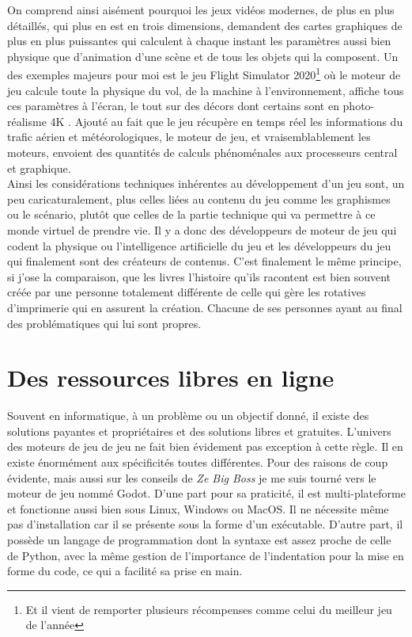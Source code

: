\documentclass{tstextbook}
\begin{document}
On comprend ainsi aisément pourquoi les jeux vidéos modernes, de plus en plus détaillés, qui plus en est en trois dimensions, demandent des cartes graphiques de plus en plus puissantes qui calculent à chaque instant les paramètres aussi bien physique que d'animation d'une scène et de tous les objets qui la composent. Un des exemples majeurs pour moi est le jeu Flight Simulator 2020\footnote{Et il vient de remporter plusieurs récompenses comme celui du meilleur jeu de l'année} où le moteur de jeu calcule toute la physique du vol, de la machine à l'environnement, affiche tous ces paramètres à l'écran, le tout sur des décors dont certains sont en photo-réalisme 4K . Ajouté au fait que le jeu récupère en temps réel les informations du trafic aérien et météorologiques, le moteur de jeu, et vraisemblablement les moteurs, envoient des quantités de calculs phénoménales aux processeurs central et graphique. \\

Ainsi les considérations techniques inhérentes au développement d'un jeu sont, un peu caricaturalement, plus celles liées au contenu du jeu comme les graphismes ou le scénario, plutôt que celles de la partie technique qui va permettre à ce monde virtuel de prendre vie. Il y a donc des développeurs de moteur de jeu qui codent la physique ou l'intelligence artificielle du jeu et les développeurs du jeu qui finalement sont des créateurs de contenus. C'est finalement le même principe, si j'ose la comparaison, que les livres l'histoire qu'ils racontent est bien souvent créée par une personne totalement différente de celle qui gère les rotatives d’imprimerie qui en assurent la création. Chacune de ses personnes ayant au final des problématiques qui lui sont propres.
\section{Des ressources libres en ligne}
Souvent en informatique, à un problème ou un objectif donné, il existe des solutions payantes et propriétaires et des solutions libres et gratuites. L'univers des moteurs de jeu de jeu ne fait bien évidement pas exception à cette règle. Il en existe énormément aux spécificités toutes différentes. Pour des raisons de coup évidente, mais aussi sur les conseils de \emph{Ze Big Boss} je me suis tourné vers le moteur de jeu nommé Godot. D'une part pour sa praticité, il est multi-plateforme et fonctionne aussi bien sous Linux, Windows ou MacOS. Il ne nécessite même pas d’installation car il se présente sous la forme d'un exécutable. D'autre part, il possède un langage de programmation dont la syntaxe est assez proche de celle de Python, avec la même gestion de l’importance de l'indentation pour la mise en forme du code, ce qui a facilité sa prise en main.
\end{document}
